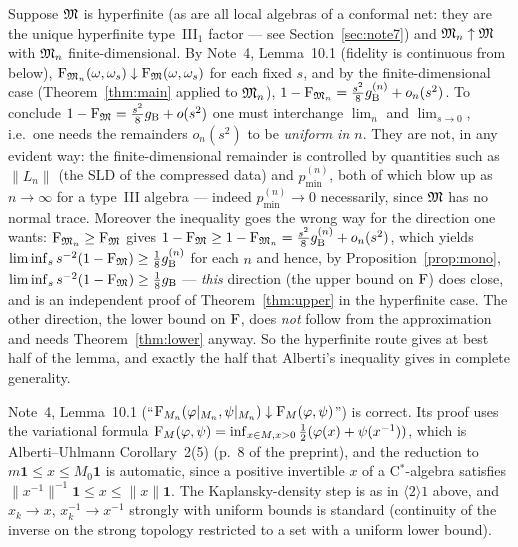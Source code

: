 \documentclass[11pt]{article}
\newcommand{\gB}{g_{\mathrm B}}
\newcommand{\norm}[1]{\lVert #1\rVert}
\newcommand{\one}{\mathbf 1}
\begin{document}
\begin{remark}\label{rem:hyperfinite}
Suppose $\mathfrak M$ is hyperfinite (as are all local algebras of a conformal net: they are the unique hyperfinite
type~III$_1$ factor --- see Section~\ref{sec:note7}) and $\mathfrak M_n\uparrow\mathfrak M$ with $\mathfrak M_n$ finite-dimensional.
By Note~4, Lemma~10.1 (fidelity is continuous from below), $\operatorname{F}_{\mathfrak M_n}(\omega,\omega_s)\downarrow\operatorname{F}_{\mathfrak M}(\omega,\omega_s)$
for each fixed $s$, and by the finite-dimensional case (Theorem~\ref{thm:main} applied to $\mathfrak M_n$),
$1-\Fid_{\cM_n}=\frac{s^2}8\gB^{(n)}+o_n(s^2)$.  To conclude
$1-\Fid_{\cM}=\frac{s^2}8\gB+o(s^2)$ one must interchange $\lim_n$ and $\lim_{s\to0}$, i.e.\ one needs the remainders
$o_n(s^2)$ to be \emph{uniform in $n$}.  They are not, in any evident way: the finite-dimensional remainder is
controlled by quantities such as $\norm{L_n}$ (the SLD of the compressed data) and $p^{(n)}_{\min}$, both of which
blow up as $n\to\infty$ for a type~III algebra --- indeed $p^{(n)}_{\min}\to0$ necessarily, since $\mathfrak M$ has no
normal trace.  Moreover the inequality goes the wrong way for the direction one wants:
$\operatorname{F}_{\mathfrak M_n}\ge\operatorname{F}_{\mathfrak M}$ gives $1-\Fid_{\cM}\ge1-\Fid_{\cM_n}=\frac{s^2}8\gB^{(n)}+o_n(s^2)$, which yields
$\liminf_s s^{-2}(1-\Fid_{\cM})\ge\frac18\gB^{(n)}$ for each $n$ and hence, by Proposition~\ref{prop:mono},
$\liminf_s s^{-2}(1-\Fid_{\cM})\ge\frac18\gB$ --- \emph{this} direction (the upper bound on $\operatorname{F}$) does close, and is
an independent proof of Theorem~\ref{thm:upper} in the hyperfinite case.  The other direction, the lower bound on
$\operatorname{F}$, does \emph{not} follow from the approximation and needs Theorem~\ref{thm:lower} anyway.
So the hyperfinite route gives at best half of the lemma, and exactly the half that Alberti's inequality gives in
complete generality.
\end{remark}

\begin{verdictok}
Note~4, Lemma~10.1 (``$\operatorname{F}_{M_n}(\varphi|_{M_n},\psi|_{M_n})\downarrow\operatorname{F}_M(\varphi,\psi)$'') is correct.  Its proof
uses the variational formula $\operatorname{F}_M(\varphi,\psi)=\inf_{x\in M,x>0}\frac12(\varphi(x)+\psi(x^{-1}))$, which is
Alberti--Uhlmann Corollary~2(5) (p.~8 of the preprint), and the reduction to $m\one\le x\le M_0\one$ is automatic,
since a positive invertible $x$ of a C$^*$-algebra satisfies $\norm{x^{-1}}^{-1}\one\le x\le\norm x\one$.
The Kaplansky-density step is as in $\langle2\rangle1$ above, and $x_k\to x$, $x_k^{-1}\to x^{-1}$ strongly with
uniform bounds is standard (continuity of the inverse on the strong topology restricted to a set with a uniform
lower bound).
\end{verdictok}
\end{document}
